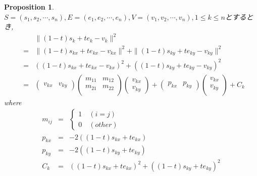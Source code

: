 \documentclass[8pt]{article}
\newtheorem{prop}{\bf Proposition}
\begin{document}
\begin{prop}\label{prop:sim}
$S = (s_1,s_2,\cdots ,s_n),E = (e_1,e_2, \cdots ,e_n),V = (v_1,v_2,\cdots,v_n), 1 \leq k \leq n$とするとき,\\
\begin{eqnarray*}
&&\|(1-t)s_k + t e_k - v_k\|^2 \\
&=& \|(1-t)s_{kx} + t e_{kx} - v_{kx}\|^2 + \|(1-t)s_{ky} + t e_{ky} - v_{ky}\|^2\\
&=&((1-t)s_{kx} + t e_{kx} - v_{kx})^2 + ((1-t)s_{ky} + t e_{ky} - v_{ky})^2\\
&=& 
\left(
     \begin{array}{cc}
      v_{kx} & v_{ky} 
     \end{array}
  \right)
\left(
     \begin{array}{cc}
 	m_{11}&m_{12}\\
    	m_{21}&m_{22}\\
     \end{array}
  \right)
 \left(
     \begin{array}{c}
 	v_{kx}\\
	v_{ky}
     \end{array}
  \right)+
\left(
     \begin{array}{cc}
      p_{kx}  & p_{ky} 
     \end{array}
  \right)
 \left(
     \begin{array}{c}
 	v_{kx}\\
	v_{ky}\\
     \end{array}
  \right) + C_k
\end{eqnarray*}
where\\
\begin{eqnarray*}
m_{ij} &=&
\begin{cases}
1\quad(i = j)\\
0\quad(other)
\end{cases}\\
p_{kx} &=& -2((1-t)s_{kx} + t e_{kx})\\
p_{ky} &=& -2((1-t)s_{ky} + t e_{ky})\\
C_k &=& ((1-t)s_{kx}+t e_{kx})^2 + ((1-t)s_{ky} + t e_{ky})^2
\end{eqnarray*}
\end{prop}
\end{document}
